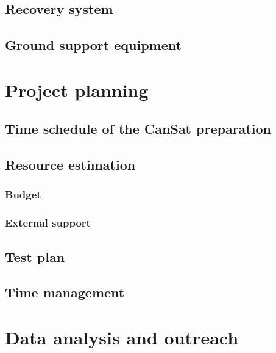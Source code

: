 \documentclass[11pt]{article}
\begin{document}
\subsection{Recovery system}

\subsection{Ground support equipment}

\section{Project planning}

\subsection{Time schedule of the CanSat preparation}

\subsection{Resource estimation}

\subsubsection{Budget}

\subsubsection{External support}

\subsection{Test plan}

\subsection{Time management}

\section{Data analysis and outreach}
\end{document}
